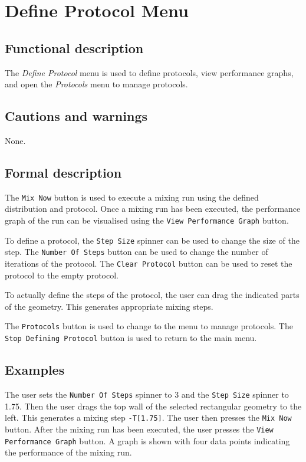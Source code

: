 \section{Define Protocol Menu}\label{sec:defprot}
  \subsection*{Functional description}
  The \emph{Define Protocol} menu is used to define protocols, view performance graphs, and open the \emph{Protocols} menu to manage protocols.

  \subsection*{Cautions and warnings}
  None.

  \subsection*{Formal description}
  The \texttt{Mix Now} button is used to execute a mixing run using the defined distribution and protocol. Once a mixing run has been executed, the performance graph of the run can be visualised using the \texttt{View Performance Graph} button.
  
  To define a protocol, the \texttt{Step Size} spinner can be used to change the size of the step. The \texttt{Number Of Steps} button can be used to change the number of iterations of the protocol. The \texttt{Clear Protocol} button can be used to reset the protocol to the empty protocol.
  
  To actually define the steps of the protocol, the user can drag the indicated parts of the geometry. This generates appropriate mixing steps.
  
  The \texttt{Protocols} button is used to change to the menu to manage protocols. The \texttt{Stop Defining Protocol} button is used to return to the main menu.

  \subsection*{Examples}
  The user sets the \texttt{Number Of Steps} spinner to 3 and the \texttt{Step Size} spinner to 1.75. Then the user drags the top wall of the selected rectangular geometry to the left. This generates a mixing step \texttt{-T[1.75]}. The user then presses the \texttt{Mix Now} button. After the mixing run has been executed, the user presses the \texttt{View Performance Graph} button. A graph is shown with four data points indicating the performance of the mixing run.
  
